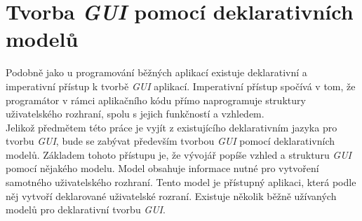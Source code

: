 \documentclass[11pt,twoside,a4paper]{book}
\begin{document}
\section{\label{SEC:modelGUI}Tvorba \textit{GUI} pomocí deklarativních modelů}
Podobně jako u programování běžných aplikací existuje deklarativní a imperativní přístup k tvorbě \textit{GUI} aplikací. Imperativní přístup spočívá v tom, že programátor v rámci aplikačního kódu přímo naprogramuje struktury uživatelského rozhraní, spolu s jejich funkčností a vzhledem.\\
Jelikož předmětem této práce je vyjít z existujícího deklarativním jazyka pro tvorbu \textit{GUI}, bude se zabývat především tvorbou \textit{GUI} pomocí deklarativních modelů. Základem tohoto přístupu je, že vývojář popíše vzhled a strukturu \textit{GUI} pomocí nějakého modelu. Model obsahuje informace nutné pro vytvoření samotného uživatelského rozhraní. Tento model je přístupný aplikaci, která podle něj vytvoří deklarované uživatelské rozraní.
Existuje několik běžně užívaných modelů pro deklarativní tvorbu \textit{GUI}.
\end{document}
